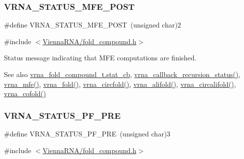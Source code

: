 \subsubsection{\texorpdfstring{VRNA\_STATUS\_MFE\_POST}{VRNA\_STATUS\_MFE\_POST}}
{\footnotesize\ttfamily \#define V\+R\+N\+A\+\_\+\+S\+T\+A\+T\+U\+S\+\_\+\+M\+F\+E\+\_\+\+P\+O\+ST~(unsigned char)2}



{\ttfamily \#include $<$\mbox{\hyperlink{fold__compound_8h}{Vienna\+R\+N\+A/fold\+\_\+compound.\+h}}$>$}



Status message indicating that M\+FE computations are finished. 

\begin{DoxySeeAlso}{See also}
\mbox{\hyperlink{group__fold__compound_a87a83f6795b569000efcbe65acc3dd81}{vrna\+\_\+fold\+\_\+compound\+\_\+t.\+stat\+\_\+cb}}, \mbox{\hyperlink{group__fold__compound_gac86036fa8cad1108832335063243cdc8}{vrna\+\_\+callback\+\_\+recursion\+\_\+status()}}, \mbox{\hyperlink{group__mfe__global_gabd3b147371ccf25c577f88bbbaf159fd}{vrna\+\_\+mfe()}}, \mbox{\hyperlink{group__mfe__global_ga29a33b2895f4e67b0480271ff289afdc}{vrna\+\_\+fold()}}, \mbox{\hyperlink{group__mfe__global_gaf973483d8acbc8cc9aacfc8a9b7f0074}{vrna\+\_\+circfold()}}, \mbox{\hyperlink{group__mfe__global_ga6c9d3bef3e92c6d423ffac9f981418c1}{vrna\+\_\+alifold()}}, \mbox{\hyperlink{group__mfe__global_ga17a1be7490468c29c335ba9bffacba53}{vrna\+\_\+circalifold()}}, \mbox{\hyperlink{group__mfe__global_ga9ef3a297201dbf838a8daff2b45c0c82}{vrna\+\_\+cofold()}} 
\end{DoxySeeAlso}
\mbox{\label{group__fold__compound_ga91795d35ebdb6f32be50459f24b3d114}} 
\subsubsection{\texorpdfstring{VRNA\_STATUS\_PF\_PRE}{VRNA\_STATUS\_PF\_PRE}}
{\footnotesize\ttfamily \#define V\+R\+N\+A\+\_\+\+S\+T\+A\+T\+U\+S\+\_\+\+P\+F\+\_\+\+P\+RE~(unsigned char)3}



{\ttfamily \#include $<$\mbox{\hyperlink{fold__compound_8h}{Vienna\+R\+N\+A/fold\+\_\+compound.\+h}}$>$}



